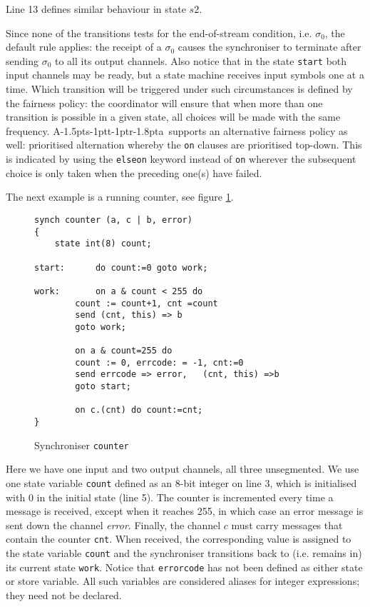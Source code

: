 \documentclass[11pt]{report}
\def\ak{{\textsf{A\kern-1.5pts\kern-1ptt\kern-1ptr\kern-1.8pta}}\kern-2pt{\it K\kern-2ptahn}}
\begin{document}
Line 13 defines similar behaviour in state $s2$.

Since none of the transitions tests for the end-of-stream condition, i.e. $\sigma_0$, the default rule applies: the receipt of
a $\sigma_0$ causes the synchroniser to terminate after sending $\sigma_0$ to all its output channels.   Also notice
that in the state \verb$start$ both input channels may be ready, but a state machine receives input symbols one at a time.
Which transition will be triggered under such circumstances is defined by the fairness policy: the coordinator will
ensure that when more than one transition is possible in a given state, all choices will be made with the same frequency.
\ak\ supports an alternative fairness policy as well: prioritised alternation whereby the \verb$on$ clauses
are prioritised top-down. This is indicated by using the \verb$elseon$ keyword instead of \verb$on$ wherever the subsequent
choice is only taken when the preceding one(s) have failed.

The next example is a running counter, see figure \ref{counter}.
\begin{figure}
\begin{lstlisting}[frame=single]
synch counter (a, c | b, error)
{
	state int(8) count;

start:		do count:=0 goto work;

work: 		on a & count < 255 do
		count := count+1, cnt =count
		send (cnt, this) => b
		goto work;
		
		on a & count=255 do
		count := 0, errcode: = -1, cnt:=0
		send errcode => error,   (cnt, this) =>b
		goto start;
		
		on c.(cnt) do count:=cnt;
}
\end{lstlisting}
\caption{Synchroniser {\tt counter}\label{counter}}
\end{figure}
Here we have one input and two output channels, all three unsegmented. We use one state variable \verb$count$ defined as an 8-bit
integer on line 3, which is initialised with 0 in the initial state (line 5). The counter is incremented every time a message is
received, except when it reaches 255, in which case an error message is sent
down the channel {\em error}.
Finally, the channel $c$  must carry messages that contain the counter \verb$cnt$. When received, the corresponding value is assigned to the state variable \verb$count$ and the synchroniser transitions back to (i.e. remains in) its current state \verb$work$. Notice that \verb"errorcode" has not been defined as either state or store variable. All such variables are considered aliases for integer expressions; they need not be declared.
\end{document}
